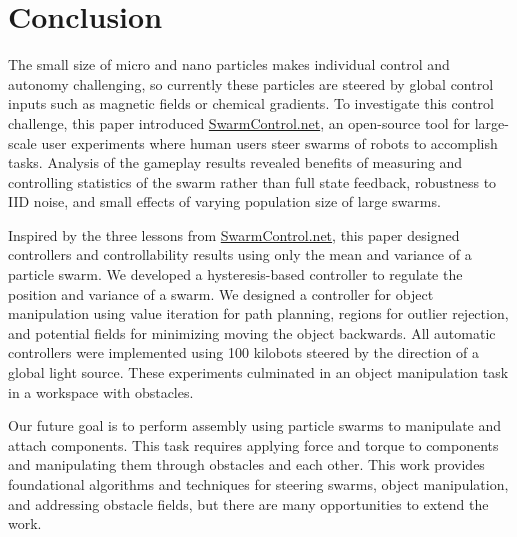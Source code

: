 \section{Conclusion}\label{sec:conclusion}
 
  The small size of micro and nano particles makes individual control and autonomy challenging, so currently these particles are steered by global control inputs such as magnetic fields or chemical gradients. To investigate this control challenge, this paper introduced \href{http://www.swarmcontrol.net}{SwarmControl.net}, an open-source tool for large-scale user experiments where human users steer swarms of robots to accomplish tasks.  Analysis of the gameplay results revealed benefits of measuring and controlling statistics of the swarm rather than full state feedback, robustness to IID noise, and small effects of varying population size of large swarms.

Inspired by the three lessons from \href{www.swarmcontrol.net}{SwarmControl.net}, this paper designed controllers and controllability results using only the mean and variance of a particle swarm. 
We developed a hysteresis-based controller to regulate the position and variance of a swarm. We designed a controller for object manipulation using value iteration for path planning, regions for outlier rejection, and potential fields for minimizing moving the object backwards. 
All automatic controllers were implemented using 100 kilobots steered by the direction of a global light source.
These experiments culminated in an object manipulation task in a workspace with obstacles.
    


Our future goal is to perform assembly using particle swarms to manipulate and attach components. This task requires applying force and torque to components and manipulating them through obstacles and each other. This work provides foundational algorithms and techniques for steering swarms, object manipulation, and addressing obstacle fields, but there are many opportunities to extend the work.

